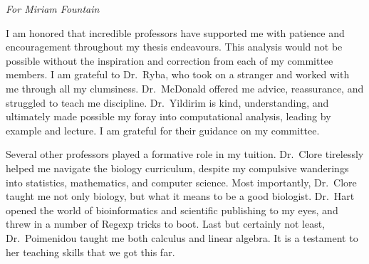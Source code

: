 
\begin{dedication}
  \textit{For Miriam Fountain}
\end{dedication}

\begin{acknowledgements}
I am honored that incredible professors have supported me with patience and encouragement throughout my thesis endeavours. This
analysis would not be possible without the inspiration and correction from each of my committee members.  I am grateful to
Dr.\ Ryba, who took on a stranger and worked with me through all my clumsiness.  Dr.\ McDonald offered me advice,
reassurance, and struggled to teach me discipline.  Dr.\ Yildirim is kind, understanding, and ultimately made possible my foray
into computational analysis, leading by example and lecture.  I am grateful for their guidance on my committee.

Several other professors played a formative role in my tuition.  Dr.\ Clore tirelessly helped me navigate the biology curriculum, despite
my compulsive wanderings into statistics, mathematics, and computer science.  Most importantly, Dr.\ Clore taught me not only biology, but what it means to be
a good biologist.  Dr.\ Hart opened the world of bioinformatics and scientific publishing to my eyes, and threw in a number of Regexp tricks
to boot.  Last but certainly not least, Dr.\ Poimenidou taught me both calculus and linear algebra.  It is a testament to her teaching
skills that we got this far.
\end{acknowledgements}
